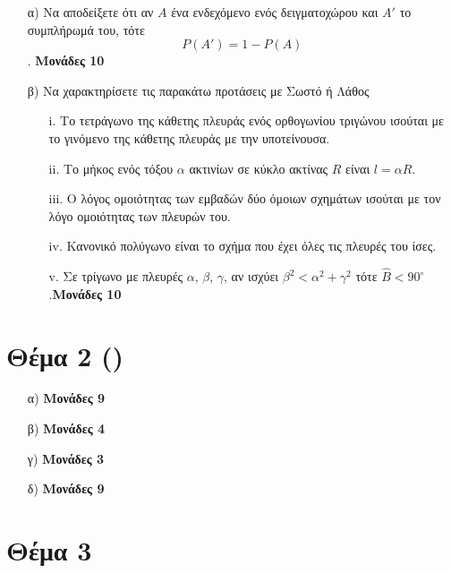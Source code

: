 \documentclass[12pt]{extarticle}
\begin{document}
\begin{enumerate}
    \item[α)] Να αποδείξετε ότι αν $Α$ ένα ενδεχόμενο ενός δειγματοχώρου και $Α'$ το συμπλήρωμά του, τότε
        $$P(Α')=1-P(Α)$$.
        \hspace*{\fill} \textbf{Μονάδες 10}

    \item[β)] Να χαρακτηρίσετε τις παρακάτω προτάσεις με Σωστό ή Λάθος
        \begin{enumerate}
            \item [i.] Το τετράγωνο της κάθετης πλευράς ενός ορθογωνίου τριγώνου ισούται με το γινόμενο της κάθετης πλευράς με την υποτείνουσα.
            \item [ii.] Το μήκος ενός τόξου $α$ ακτινίων σε κύκλο ακτίνας $R$ είναι $l=αR$.
            \item [iii.] Ο λόγος ομοιότητας των εμβαδών δύο όμοιων σχημάτων ισούται με τον λόγο ομοιότητας των πλευρών του.
            \item [iv.] Κανονικό πολύγωνο είναι το σχήμα που έχει όλες τις πλευρές του ίσες.
            \item [v.] Σε τρίγωνο με πλευρές $α$, $β$, $γ$, αν ισχύει $β^2<α^2+γ^2$ τότε $\hat{Β}<90^{\circ}$.\hspace*{\fill}\textbf{Μονάδες 10}
        \end{enumerate}
\end{enumerate}

\section*{Θέμα 2 ()}
\noindent
\begin{enumerate}
    \item[α)]  \hspace*{\fill} \textbf{Μονάδες 9}
    \item[β)]   \hspace*{\fill} \textbf{Μονάδες 4}
    \item[γ)]  \hspace*{\fill} \textbf{Μονάδες 3}
    \item[δ)]  \hspace*{\fill} \textbf{Μονάδες 9}
\end{enumerate}

\section*{Θέμα 3}
\end{document}
